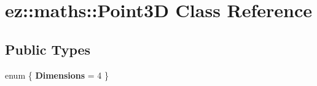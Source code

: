 \hypertarget{classez_1_1maths_1_1Point3D}{}\section{ez\+:\+:maths\+:\+:Point3D Class Reference}
\label{classez_1_1maths_1_1Point3D}
\subsection*{Public Types}
\begin{DoxyCompactItemize}
\item 
\mbox{\label{classez_1_1maths_1_1Point3D_a0c4a374914d7e1a4762a46c80b619aeb}} 
enum \{ {\bfseries Dimensions} = 4
 \}
\end{DoxyCompactItemize}

